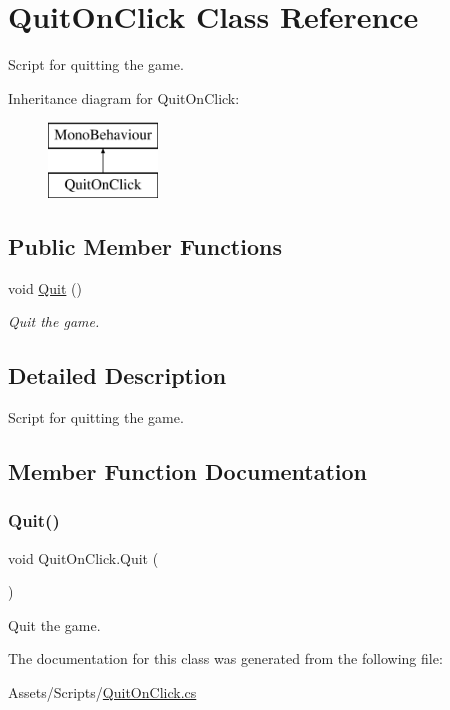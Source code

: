 \hypertarget{class_quit_on_click}{}\section{Quit\+On\+Click Class Reference}
\label{class_quit_on_click}


Script for quitting the game.  


Inheritance diagram for Quit\+On\+Click\+:\begin{figure}[H]
\begin{center}
\leavevmode
\includegraphics[height=2.000000cm]{class_quit_on_click}
\end{center}
\end{figure}
\subsection*{Public Member Functions}
\begin{DoxyCompactItemize}
\item 
void \mbox{\hyperlink{class_quit_on_click_a2ae4a389fc44a04218d7a1353bcc870a}{Quit}} ()
\begin{DoxyCompactList}\small\item\em Quit the game. \end{DoxyCompactList}\end{DoxyCompactItemize}


\subsection{Detailed Description}
Script for quitting the game. 

\subsection{Member Function Documentation}
\mbox{\label{class_quit_on_click_a2ae4a389fc44a04218d7a1353bcc870a}} 
\subsubsection{\texorpdfstring{Quit()}{Quit()}}
{\footnotesize\ttfamily void Quit\+On\+Click.\+Quit (\begin{DoxyParamCaption}{ }\end{DoxyParamCaption})}



Quit the game. 



The documentation for this class was generated from the following file\+:\begin{DoxyCompactItemize}
\item 
Assets/\+Scripts/\mbox{\hyperlink{_quit_on_click_8cs}{Quit\+On\+Click.\+cs}}\end{DoxyCompactItemize}
